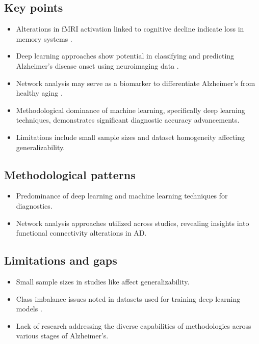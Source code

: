\documentclass{MITcsail}
\begin{document}
\subsection*{Key points}
\begin{itemize}
  \item Alterations in fMRI activation linked to cognitive decline indicate loss in memory systems \citep{ref_10_1523_jneurosci_2250_06_2006}.
  \item Deep learning approaches show potential in classifying and predicting Alzheimer's disease onset using neuroimaging data \citep{ref_10_3389_fnagi_2019_00220,ref_10_1109_access_2021_3090474}.
  \item Network analysis may serve as a biomarker to differentiate Alzheimer's from healthy aging \citep{ref_10_1371_journal_pcbi_1000100}.
  \item Methodological dominance of machine learning, specifically deep learning techniques, demonstrates significant diagnostic accuracy advancements.
  \item Limitations include small sample sizes and dataset homogeneity affecting generalizability.
\end{itemize}

\subsection*{Methodological patterns}
\begin{itemize}
  \item Predominance of deep learning and machine learning techniques for diagnostics.
  \item Network analysis approaches utilized across studies, revealing insights into functional connectivity alterations in AD.
\end{itemize}

\subsection*{Limitations and gaps}
\begin{itemize}
  \item Small sample sizes in studies like \citet{ref_10_1523_jneurosci_2250_06_2006} affect generalizability.
  \item Class imbalance issues noted in datasets used for training deep learning models \citep{ref_10_1186_1471_2202_10_101,ref_10_1109_access_2021_3090474}.
  \item Lack of research addressing the diverse capabilities of methodologies across various stages of Alzheimer's.
\end{itemize}
\end{document}

